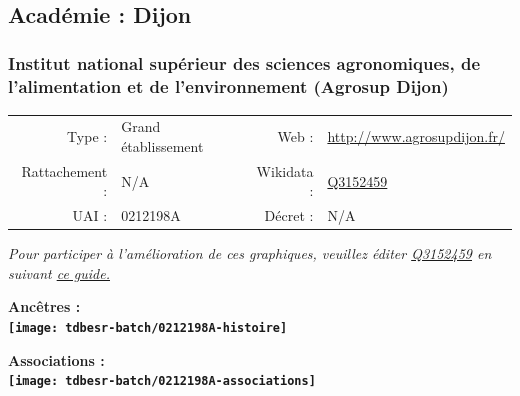 \documentclass[12pt,french,]{article}
\begin{document}
\ifoddpage ~\newpage \fi   

\hypertarget{acaduxe9mie-dijon-1}{%
\subsection{Académie : Dijon}\label{acaduxe9mie-dijon-1}}

\hypertarget{institut-national-supuxe9rieur-des-sciences-agronomiques-de-lalimentation-et-de-lenvironnement-agrosup-dijon}{%
\subsubsection{Institut national supérieur des sciences agronomiques, de
l'alimentation et de l'environnement (Agrosup
Dijon)}\label{institut-national-supuxe9rieur-des-sciences-agronomiques-de-lalimentation-et-de-lenvironnement-agrosup-dijon}}

\begin{tabular*}{\textwidth}{rp{5cm}rl}  
\hline  
Type : & Grand établissement & Web : &\href{http://www.agrosupdijon.fr/}{http://www.agrosupdijon.fr/} \\  
Rattachement : & N/A & Wikidata : & \href{https://www.wikidata.org/entity/Q3152459}{Q3152459} \\  
UAI : & 0212198A & Décret : & N/A \\  
\hline  
\end{tabular*}

\textit{\scriptsize Pour participer à l'amélioration de ces graphiques, veuillez éditer  \href{https://www.wikidata.org/entity/Q3152459}{Q3152459}  en suivant \href{https://github.com/cpesr/wikidataESR/blob/master/Rmd/wikidataESR.md}{ce guide.}}

\vspace{1cm}  
\begin{minipage}[b]{0.50\textwidth}\begin{center} \bf Ancêtres : \\  
\texttt{[image: tdbesr-batch/0212198A-histoire]} \end{center}\end{minipage}\begin{minipage}[b]{0.50\textwidth}\begin{center} \bf Associations : \\  
\texttt{[image: tdbesr-batch/0212198A-associations]} \end{center}\end{minipage}

\hrulefill
\end{document}
